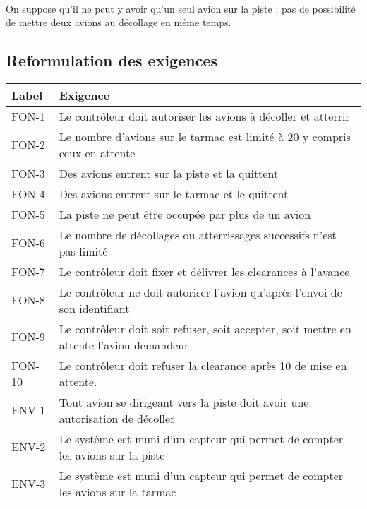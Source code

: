 \paragraph{}
On suppose qu'il ne peut y avoir qu'un seul avion sur la piste ; pas de possibilité
de mettre deux avions au décollage en même temps.


\subsection{Reformulation des exigences}



\begin{tabular}{|l|l|}
	\hline 
	\textbf{Label}&\textbf{Exigence}  \\ 
	\hline 
	FON-1&Le contrôleur doit autoriser les avions à décoller et atterrir  \\ 
	\hline 
FON-2	& Le nombre d'avions sur le tarmac est limité à 20 y compris ceux en attente  \\ 
	\hline 
	FON-3& Des avions entrent sur la piste et la quittent  \\ 
	\hline 
	FON-4& Des avions entrent sur le tarmac et le quittent  \\ 
	\hline 
	FON-5& La piste ne peut être occupée par plus de un avion \\ 
	\hline 
	FON-6& Le nombre de décollages ou atterrissages successifs n'est pas limité   \\ 
	\hline 
	FON-7& Le contrôleur doit fixer et délivrer les clearances à l'avance   \\ 
	\hline 
	FON-8& Le contrôleur ne doit autoriser l'avion qu'après l'envoi de son identifiant    \\ 
		\hline
	FON-9& Le contrôleur doit soit refuser, soit accepter, soit mettre en attente l'avion demandeur   \\ 
 	\hline
 FON-10& Le contrôleur doit refuser la clearance après 10 de mise en attente.   \\ 
	\hline 
   ENV-1 &Tout avion se dirigeant vers la piste doit avoir une autorisation de décoller \\ 
   	\hline 
   ENV-2 &Le système est muni d'un capteur qui permet de compter les avions sur la piste \\ 
   \hline 
   ENV-3 &Le système est muni d'un capteur qui permet de compter les avions sur la tarmac \\ 
	\hline 
\end{tabular} 

